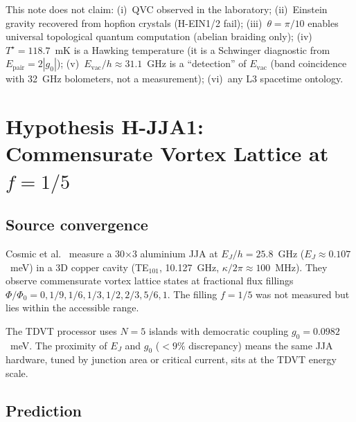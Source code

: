 \documentclass[11pt,letterpaper]{article}
\newcommand{\gzero}{g_0}
\newcommand{\Evac}{E_{\mathrm{vac}}}
\newcommand{\Tstar}{T^{\!\star}}
\begin{document}
\begin{nonclaim}
This note does not claim: (i)~QVC observed in the laboratory; (ii)~Einstein gravity recovered from hopfion crystals (H-EIN1/2 fail); (iii)~$\theta = \pi/10$ enables universal topological quantum computation (abelian braiding only); (iv)~$\Tstar = 118.7$~mK is a Hawking temperature (it is a Schwinger diagnostic from $E_{\mathrm{pair}} = 2|\gzero|$); (v)~$\Evac/h \approx 31.1$~GHz is a ``detection'' of $\Evac$ (band coincidence with 32~GHz bolometers, not a measurement); (vi)~any L3 spacetime ontology.
\end{nonclaim}


\section{Hypothesis H-JJA1: Commensurate Vortex Lattice at $f = 1/5$}\label{sec:hjja1}

\subsection{Source convergence}
Cosmic et al.~\cite{Cosmic2018} measure a 30$\times$3 aluminium JJA at $E_J/h = 25.8$~GHz ($E_J \approx 0.107$~meV) in a 3D copper cavity (TE$_{101}$, 10.127~GHz, $\kappa/2\pi \approx 100$~MHz).  They observe commensurate vortex lattice states at fractional flux fillings $\Phi/\Phi_0 = 0, 1/9, 1/6, 1/3, 1/2, 2/3, 5/6, 1$.
The filling $f = 1/5$ was not measured but lies within the accessible range.

The TDVT processor uses $N = 5$ islands with democratic coupling $\gzero = 0.0982$~meV.  The proximity of $E_J$ and $\gzero$ ($< 9\%$ discrepancy) means the same JJA hardware, tuned by junction area or critical current, sits at the TDVT energy scale.

\subsection{Prediction}
\end{document}
